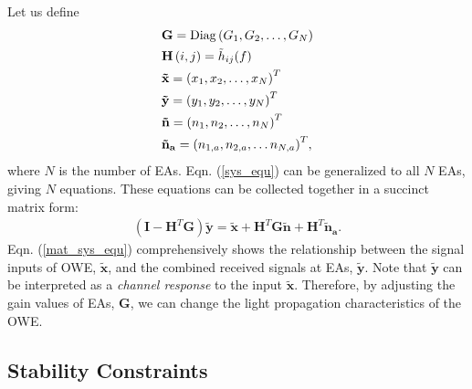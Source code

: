 \par
Let us define 
\begin{equation}
    \label{symbol_definitions}
    \begin{aligned}
        &\mathbf{G} = {\mathop{\rm Diag}\nolimits} \left( {{G_1},{G_2}, \ldots ,{G_N}} \right)\\
        &\mathbf{H}\left( {i,j} \right) = {{\tilde h}_{ij}}(f)\\
        &\mathbf{\tilde x} = {\left( {{x_1},{x_2}, \ldots ,{x_N}} \right)^T}\\
        &\mathbf{\tilde y} = {\left( {{y_1},{y_2}, \ldots ,{y_N}} \right)^T}\\
        &\mathbf{\tilde n} = {\left( {{n_1},{n_2}, \ldots ,{n_N}} \right)^T}\\
        &{{\mathbf{\tilde n}}_\mathbf{a}} = {\left( {{n_{1,a}}, {n_{2,a}}, \ldots {n_{N,a}}} \right)^T},
    \end{aligned}
\end{equation}
where $N$ is the number of EAs. Eqn. (\ref{sys_equ}) can be generalized to all $N$ EAs, giving $N$ equations. These equations can be collected together in a succinct matrix form:
\begin{equation}
\label{mat_sys_equ}
\begin{array}{c}
\left( {\mathbf{I} - {\mathbf{H}^T}\mathbf{G}} \right)\mathbf{\tilde y} = \mathbf{\tilde x + }{\mathbf{H}^T}\mathbf{G\tilde n + }{\mathbf{H}^T}{{\mathbf{\tilde n}}_\mathbf{a}} \text{.}
\end{array}
\end{equation}
Eqn. (\ref{mat_sys_equ}) comprehensively shows the relationship between the signal inputs of OWE, $\mathbf{\tilde{x}}$, and the combined received signals at EAs, $\mathbf{\tilde{y}}$. Note that $\mathbf{\tilde{y}}$ can be interpreted as a \textit{channel response} to the input $\mathbf{\tilde{x}}$. Therefore, by adjusting the gain values of EAs, $\mathbf{G}$, we can change the light propagation characteristics of the OWE.

\subsection{Stability Constraints}

